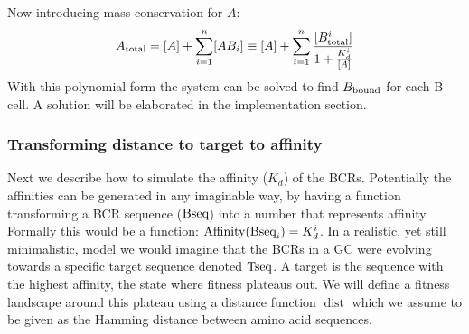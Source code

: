 \noindent
Now introducing mass conservation for $A$:
\begin{equation}
A_{\text{total}} = [A] + \sum_{i=1}^{n} [AB_i] \equiv [A] + \sum_{i=1}^{n} \frac{[B^i_{\text{total}}]}{1 + \frac{K^i_d}{[A]}}
  \label{eq:A_objective}
\end{equation}
With this polynomial form the system can be solved to find $B_{\text{bound}}$ for each B cell.
A solution will be elaborated in the implementation section.




\subsubsection{Transforming distance to target to affinity}
Next we describe how to simulate the affinity ($K_d$) of the BCRs.
Potentially the affinities can be generated in any imaginable way, by having a function transforming a BCR sequence ($\text{Bseq}$) into a number that represents affinity.
Formally this would be a function: $\text{Affinity}(\text{Bseq}_i) = K^i_d$.
In a realistic, yet still minimalistic, model we would imagine that the BCRs in a GC were evolving towards a specific target sequence denoted $\text{Tseq}$.
A target is the sequence with the highest affinity, the state where fitness plateaus out.
We will define a fitness landscape around this plateau using a distance function $\operatorname{dist}$ which we assume to be given as the Hamming distance between amino acid sequences.

